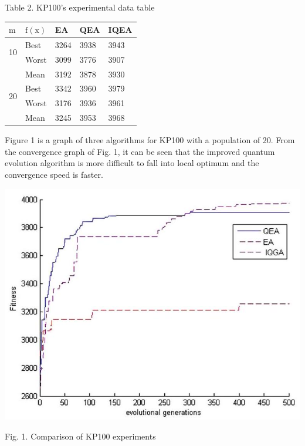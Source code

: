 \documentclass[10pt]{article}
\begin{document}
Table 2. KP100's experimental data table

\begin{center}
\begin{tabular}{l|l|l|l|l}
\hline
$\mathrm{m}$ & $\mathrm{f}(\mathrm{x})$ & EA & QEA & IQEA \\
\hline
\multirow{2}{*}{10} & Best & 3264 & 3938 & 3943 \\
\cline { 2 - 5 }
 & Worst & 3099 & 3776 & 3907 \\
\cline { 2 - 5 }
 & Mean & 3192 & 3878 & 3930 \\
\hline
\multirow{2}{*}{20} & Best & 3342 & 3960 & 3979 \\
\cline { 2 - 5 }
 & Worst & 3176 & 3936 & 3961 \\
\cline { 2 - 5 }
 & Mean & 3245 & 3953 & 3968 \\
\hline
\end{tabular}
\end{center}

Figure 1 is a graph of three algorithms for KP100 with a population of 20. From the convergence graph of Fig. 1, it can be seen that the improved quantum evolution algorithm is more difficult to fall into local optimum and the convergence speed is faster.

\begin{center}
\includegraphics[max width=\textwidth]{2023_06_23_b12b6b8aa353d93821cag-09}
\end{center}

Fig. 1. Comparison of KP100 experiments
\end{document}
